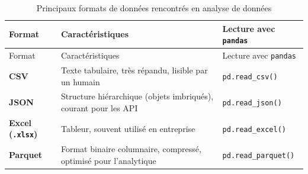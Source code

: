 \documentclass[
  french,
  letterpaper,
  open=any]{scrbook}
\theoremstyle{definition}
\theoremstyle{definition}
\theoremstyle{remark}
\begin{document}
\begin{longtable}[]{@{}
  >{\raggedright\arraybackslash}p{}
  >{\raggedright\arraybackslash}p{}
  >{\raggedright\arraybackslash}p{}@{}}
\caption{Principaux formats de données rencontrés en analyse de
données}\label{tbl-formats-donnees}\tabularnewline
\toprule\noalign{}
\begin{minipage}[b]{\linewidth}\raggedright
Format
\end{minipage} & \begin{minipage}[b]{\linewidth}\raggedright
Caractéristiques
\end{minipage} & \begin{minipage}[b]{\linewidth}\raggedright
Lecture avec \texttt{pandas}
\end{minipage} \\
\midrule\noalign{}
\endfirsthead
\toprule\noalign{}
\begin{minipage}[b]{\linewidth}\raggedright
Format
\end{minipage} & \begin{minipage}[b]{\linewidth}\raggedright
Caractéristiques
\end{minipage} & \begin{minipage}[b]{\linewidth}\raggedright
Lecture avec \texttt{pandas}
\end{minipage} \\
\midrule\noalign{}
\endhead
\bottomrule\noalign{}
\endlastfoot
\textbf{CSV} & Texte tabulaire, très répandu, lisible par un humain &
\texttt{pd.read\_csv()} \\
\textbf{JSON} & Structure hiérarchique (objets imbriqués), courant pour
les API & \texttt{pd.read\_json()} \\
\textbf{Excel (\texttt{.xlsx})} & Tableur, souvent utilisé en entreprise
& \texttt{pd.read\_excel()} \\
\textbf{Parquet} & Format binaire columnaire, compressé, optimisé pour
l'analytique & \texttt{pd.read\_parquet()} \\
\end{longtable}
\end{document}
